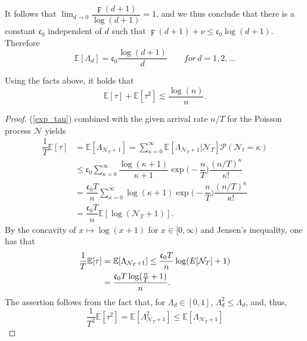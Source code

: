 It follows that $\lim_{d \to 0}\dfrac{\digamma (d+1)}{\log(d+1)} = 1$, and we thus conclude that there is a constant $\mathfrak{c}_0$ independent of $d$ such that $\digamma (d+1)+ \nu \leq \mathfrak{c}_0 \log(d+1) $. Therefore
\begin{equation*}
     \mathbb{E}[\Lambda_{d}] = \mathfrak{c}_0 \dfrac{\log(d+1)}{d} \qquad for \, d = 1, 2, \ldots
\end{equation*}
\begin{proposition}\label{Mom_tau}
Using the facts above, it holds that 
\begin{equation*}
    \mathbb{E}[\tau] + \mathbb{E}[\tau^2] \lesssim \dfrac{\log(n)}{n}.
\end{equation*}
\end{proposition}
\begin{proof}
(\ref{exp_tau}) combined with the given arrival rate $n/T$ for the Poisson process $\mathcal{N}$ yields
\begin{equation*}
    \begin{split}
        \dfrac{1}{T}\mathbb{E}[\tau] &= \mathbb{E}[\Lambda_{\mathcal{N}_T+1}]= \sum_{\kappa=0}^\infty \mathbb{E}[\Lambda_{\mathcal{N}_T+1} | \mathcal{N}_T] \mathcal{P} (\mathcal{N}_t = \kappa)\\
        &\leq \mathfrak{c}_0 \sum_{\kappa=0}^\infty \dfrac{\log(\kappa+1)}{\kappa+1}\exp{\big(-\dfrac{n}{T}\big)}\dfrac{(n/T)^\kappa}{\kappa!}\\
        &= \dfrac{\mathfrak{c}_0 T}{n} \sum_{\kappa=0}^\infty \log(\kappa+1)\exp{\big(-\dfrac{n}{T}\big)}\dfrac{(n/T)^\kappa}{\kappa!}\\
        &= \dfrac{\mathfrak{c}_0 T}{n}\mathbb{E}[\log(\mathcal{N}_T+1)].
    \end{split}
\end{equation*}
By the concavity of $x \mapsto \log (x + 1)$ for $x \in [0, \infty)$ and Jensen's inequality, one has that 
\begin{equation*}
    \begin{split}
         \dfrac{1}{T}\mathbb{E}[\tau] &= \mathbb{E}[\Lambda_{\mathcal{N}_T+1}] \leq \dfrac{\mathfrak{c}_0 T}{n}\log(\mathcal\mathbb{E}[{\mathcal{N}}_T]+1)\\
         &= \dfrac{\mathfrak{c}_0 T \log(\frac{n}{T}+1)}{n}.
    \end{split}
\end{equation*}
The assertion follows from the fact that, for $\Lambda_{d} \in [0, 1]$, $\Lambda_{d}^2 \leq \Lambda_{d}$, and, thus,
\begin{equation*}
     \dfrac{1}{T^2}\mathbb{E}[\tau^2] = \mathbb{E}[\Lambda^2_{\mathcal{N}_T+1}] \leq \mathbb{E}[\Lambda_{\mathcal{N}_T+1}]
\end{equation*}
\end{proof}
